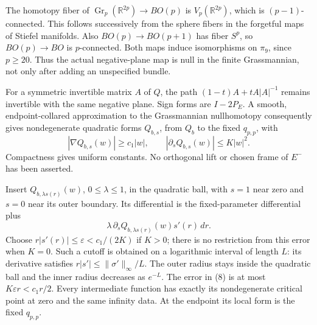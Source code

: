 \documentclass[11pt]{article}
\newcommand{\R}{\mathbb R}
\newcommand{\Gr}{\operatorname{Gr}}
\begin{document}
The homotopy fiber of \(\Gr_p(\R^{2p})\to BO(p)\) is
\(V_p(\R^{2p})\), which is \((p-1)\)-connected.
This follows successively from the sphere fibers in the
forgetful maps of Stiefel manifolds.
Also \(BO(p)\to BO(p+1)\) has fiber \(S^p\), so
\(BO(p)\to BO\) is \(p\)-connected.
Both maps induce isomorphisms on \(\pi_9\), since \(p\geq20\).
Thus the actual negative-plane map is null in the finite
Grassmannian, not only after adding an unspecified bundle.

For a symmetric invertible matrix \(A\) of \(Q\), the path
\((1-t)A+tA|A|^{-1}\) remains invertible with the same negative plane.
Sign forms are \(I-2P_E\).
A smooth, endpoint-collared approximation to the Grassmannian
nullhomotopy consequently gives nondegenerate quadratic forms
\(Q_{b,s}\), from \(Q_b\) to the fixed \(q_{p,p}\), with
\[
 |\nabla Q_{b,s}(w)|\geq c_1|w|,\qquad
 |\partial_s Q_{b,s}(w)|\leq K|w|^2.              \tag{7}
\]
Compactness gives uniform constants. No orthogonal lift or
chosen frame of \(E^-\) has been asserted.

Insert \(Q_{b,\lambda s(r)}(w)\), \(0\leq\lambda\leq1\), in the
quadratic ball, with \(s=1\) near zero and \(s=0\) near its outer
boundary. Its differential is the fixed-parameter differential plus
\[
 \lambda\,\partial_sQ_{b,\lambda s(r)}(w)s'(r)\,dr .
 \tag{8}
\]
Choose \(r|s'(r)|\leq\varepsilon<c_1/(2K)\) if \(K>0\);
there is no restriction from this error when \(K=0\).
Such a cutoff is obtained on a logarithmic interval of length \(L\):
its derivative satisfies \(r|s'|\leq\|\sigma'\|_\infty/L\).
The outer radius stays inside the quadratic ball and the inner
radius decreases as \(e^{-L}\). The error in (8) is at most
\(K\varepsilon r<c_1r/2\).
Every intermediate function has exactly its nondegenerate critical
point at zero and the same infinity data. At the endpoint its
local form is the fixed \(q_{p,p}\).
\end{document}
